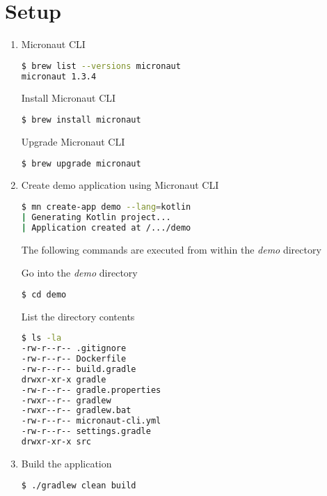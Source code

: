 \documentclass[12pt, letterpaper]{article}
\begin{document}
  \section{Setup}\label{sec:setup}

  \begin{enumerate}

    \item{ Micronaut CLI

      \begin{lstlisting}[language=bash]
$ brew list --versions micronaut
micronaut 1.3.4
      \end{lstlisting}

      Install Micronaut CLI
      \begin{lstlisting}[language=bash]
$ brew install micronaut
      \end{lstlisting}

      Upgrade Micronaut CLI
      \begin{lstlisting}[language=bash]
$ brew upgrade micronaut
      \end{lstlisting}
    }

    \item{ Create demo application using Micronaut CLI

      \begin{lstlisting}[language=bash]
$ mn create-app demo --lang=kotlin
| Generating Kotlin project...
| Application created at /.../demo
      \end{lstlisting}

      The following commands are executed from within the \textit{demo} directory

      Go into the \textit{demo} directory

      \begin{lstlisting}[language=bash]
$ cd demo
      \end{lstlisting}

      List the directory contents

      \begin{lstlisting}[language=bash]
$ ls -la
-rw-r--r-- .gitignore
-rw-r--r-- Dockerfile
-rw-r--r-- build.gradle
drwxr-xr-x gradle
-rw-r--r-- gradle.properties
-rwxr--r-- gradlew
-rwxr--r-- gradlew.bat
-rw-r--r-- micronaut-cli.yml
-rw-r--r-- settings.gradle
drwxr-xr-x src
      \end{lstlisting}
    }

    \item{ Build the application

      \begin{lstlisting}[language=bash]
$ ./gradlew clean build
      \end{lstlisting}
    }


\end{enumerate}
\end{document}
